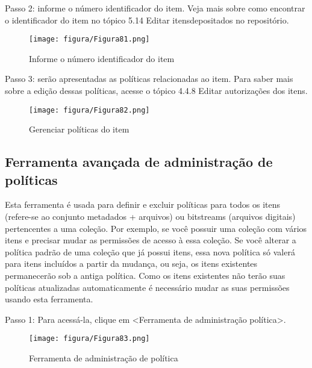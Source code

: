 \documentclass[12pt,hidelinks]{article}
\begin{document}
    \singlespacing
    
    Passo 2: informe o número identificador do item. Veja mais sobre como encontrar o identificador do item no tópico 5.14 Editar itensdepositados no repositório.
    
    \begin{figure}[!htp]
                \centering
                \texttt{[image: figura/Figura81.png]}
                \caption{Informe o número identificador do item}
            \label{Rotulo}
        \end{figure}
    
    Passo 3: serão apresentadas as políticas relacionadas ao item. Para saber mais sobre a edição dessas políticas, acesse o tópico 4.4.8 Editar autorizações dos itens.
    
     \begin{figure}[!htp]
                \centering
                \texttt{[image: figura/Figura82.png]}
                \caption{Gerenciar políticas do item}
            \label{Rotulo}
        \end{figure}

\newpage

    \subsection{Ferramenta avançada de administração de políticas}
    
    Esta ferramenta é usada para definir e excluir políticas para todos os itens (refere-se ao conjunto metadados + arquivos) ou bitstreams (arquivos digitais) pertencentes a uma coleção. Por exemplo, se você possuir uma coleção com vários itens e precisar mudar as permissões de acesso à essa coleção. Se você alterar a política padrão de uma coleção que já possui itens, essa nova política só valerá para itens incluídos a partir da mudança, ou seja, os itens existentes permanecerão sob a antiga política. Como os itens existentes não terão suas políticas atualizadas automaticamente é necessário mudar as suas permissões usando esta ferramenta.
    
    \singlespacing
    
    Passo 1: Para acessá-la, clique em <Ferramenta de administração política>.
    
    \begin{figure}[!htp]
                \centering
                \texttt{[image: figura/Figura83.png]}
                \caption{Ferramenta de administração de política}
            \label{Rotulo}
        \end{figure}
    
\end{document}
